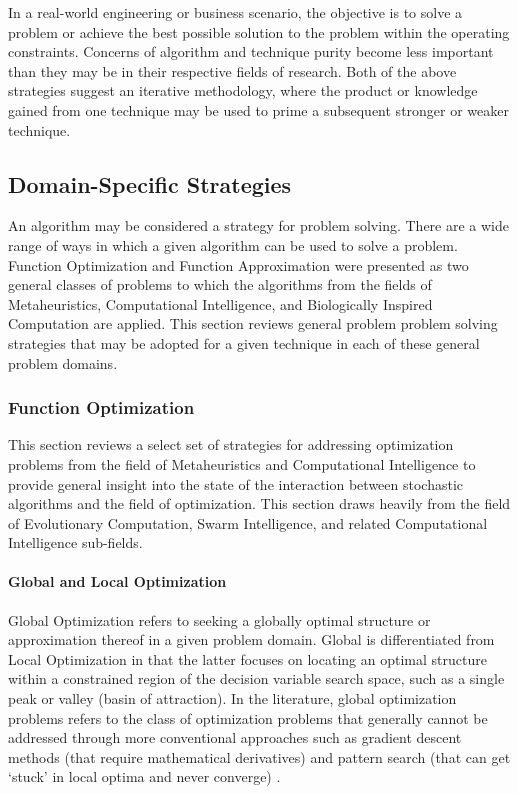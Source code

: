 In a real-world engineering or business scenario, the objective is to solve a problem or achieve the best possible solution to the problem within the operating constraints.
Concerns of algorithm and technique purity become less important than they may be in their respective fields of research.
Both of the above strategies suggest an iterative methodology, where the product or knowledge gained from one technique may be used to prime a subsequent stronger or weaker technique. 

%
%
\subsection{Domain-Specific Strategies}
\label{sec:strategies}
An algorithm may be considered a strategy for problem solving. There are a wide range of ways in which a given algorithm can be used to solve a problem. 
Function Optimization and Function Approximation were presented as two general classes of problems to which the algorithms from the fields of Metaheuristics, Computational Intelligence, and Biologically Inspired Computation are applied. 
This section reviews general problem problem solving strategies that may be adopted for a given technique in each of these general problem domains.

%
%
\subsubsection{Function Optimization}
This section reviews a select set of strategies for addressing optimization problems from the field of Metaheuristics and Computational Intelligence to provide general insight into the state of the interaction between stochastic algorithms and the field of optimization. This section draws heavily from the field of Evolutionary Computation, Swarm Intelligence, and related Computational Intelligence sub-fields.
	
\paragraph{Global and Local Optimization}
Global Optimization refers to seeking a globally optimal structure or approximation thereof in a given problem domain. Global is differentiated from Local Optimization in that the latter focuses on locating an optimal structure within a constrained region of the decision variable search space, such as a single peak or valley (basin of attraction). In the literature, global optimization problems refers to the class of optimization problems that generally cannot be addressed through more conventional approaches such as gradient descent methods (that require mathematical derivatives) and pattern search (that can get `stuck' in local optima and never converge) \cite{Price1977, Toern1999}. 

